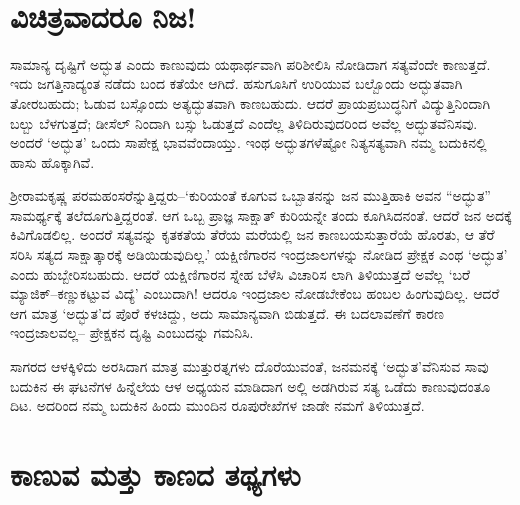  \item {}\\
\begin{flushright}
\end{flushright}



\section{ವಿಚಿತ್ರವಾದರೂ ನಿಜ!}

ಸಾಮಾನ್ಯ ದೃಷ್ಟಿಗೆ ಅದ್ಭುತ ಎಂದು ಕಾಣುವುದು ಯಥಾರ್ಥವಾಗಿ ಪರಿಶೀಲಿಸಿ ನೋಡಿದಾಗ ಸತ್ಯವೆಂದೇ ಕಾಣುತ್ತದೆ. ಇದು ಜಗತ್ತಿನಾದ್ಯಂತ ನಡೆದು ಬಂದ ಕತೆಯೇ ಆಗಿದೆ. ಹಸುಗೂಸಿಗೆ ಉರಿಯುವ ಬಲ್ಬೊಂದು ಅದ್ಭುತವಾಗಿ ತೋರಬಹುದು; ಓಡುವ ಬಸ್ಸೊಂದು ಅತ್ಯದ್ಭುತವಾಗಿ ಕಾಣಬಹುದು. ಆದರೆ ಪ್ರಾಯಪ್ರಬುದ್ಧನಿಗೆ ವಿದ್ಯುತ್ತಿನಿಂದಾಗಿ ಬಲ್ಬು ಬೆಳಗುತ್ತದೆ; ಡೀಸೆಲ್ ನಿಂದಾಗಿ ಬಸ್ಸು ಓಡುತ್ತದೆ ಎಂದೆಲ್ಲ ತಿಳಿದಿರುವುದರಿಂದ ಅವೆಲ್ಲ ಅದ್ಭುತವೆನಿಸವು. ಅಂದರೆ ‘ಅದ್ಭುತ’ ಒಂದು ಸಾಪೇಕ್ಷ ಭಾವವೆಂದಾಯ್ತು. ಇಂಥ ಅದ್ಭುತಗಳೆಷ್ಟೋ ನಿತ್ಯಸತ್ಯವಾಗಿ ನಮ್ಮ ಬದುಕಿನಲ್ಲಿ ಹಾಸು ಹೊಕ್ಕಾಗಿವೆ.

ಶ‍್ರೀರಾಮಕೃಷ್ಣ ಪರಮಹಂಸರೆನ್ನುತ್ತಿದ್ದರು–‘ಕುರಿಯಂತೆ ಕೂಗುವ ಒಬ್ಬಾತನನ್ನು ಜನ ಮುತ್ತಿಹಾಕಿ ಅವನ “ಅದ್ಭುತ” ಸಾಮರ್ಥ್ಯಕ್ಕೆ ತಲೆದೂಗುತ್ತಿದ್ದರಂತೆ. ಆಗ ಒಬ್ಬ ಪ್ರಾಜ್ಞ ಸಾಕ್ಷಾತ್ ಕುರಿಯನ್ನೇ ತಂದು ಕೂಗಿಸಿದನಂತೆ. ಆದರೆ ಜನ ಅದಕ್ಕೆ ಕಿವಿಗೊಡಲಿಲ್ಲ. ಅಂದರೆ ಸತ್ಯವನ್ನು ಕೃತಕತೆಯ ತೆರೆಯ ಮರೆಯಲ್ಲಿ ಜನ ಕಾಣಬಯಸುತ್ತಾರೆಯೆ ಹೊರತು, ಆ ತೆರೆ ಸರಿಸಿ ಸತ್ಯದ ಸಾಕ್ಷಾತ್ಕಾರಕ್ಕೆ ಅಡಿಯಿಡುವುದಿಲ್ಲ.’ ಯಕ್ಷಿಣಿಗಾರನ ಇಂದ್ರಜಾಲಗಳನ್ನು ನೋಡಿದ ಪ್ರೇಕ್ಷಕ ಎಂಥ ‘ಅದ್ಭುತ’ ಎಂದು ಹುಬ್ಬೇರಿಸಬಹುದು. ಆದರೆ ಯಕ್ಷಿಣಿಗಾರನ ಸ್ನೇಹ ಬೆಳೆಸಿ ವಿಚಾರಿಸ ಲಾಗಿ ತಿಳಿಯುತ್ತದೆ ಅವೆಲ್ಲ ‘ಬರೆ ಮ್ಯಾಜಿಕ್​–ಕಣ್ಣುಕಟ್ಟುವ ವಿದ್ಯೆ’ ಎಂಬುದಾಗಿ! ಆದರೂ ಇಂದ್ರಜಾಲ ನೋಡಬೇಕೆಂಬ ಹಂಬಲ ಹಿಂಗುವುದಿಲ್ಲ. ಆದರೆ ಆಗ ಮಾತ್ರ ‘ಅದ್ಭುತ’ದ ಪೊರೆ ಕಳಚಿದ್ದು, ಅದು ಸಾಮಾನ್ಯವಾಗಿ ಬಿಡುತ್ತದೆ. ಈ ಬದಲಾವಣೆಗೆ ಕಾರಣ ಇಂದ್ರಜಾಲವಲ್ಲ– ಪ್ರೇಕ್ಷಕನ ದೃಷ್ಟಿ ಎಂಬುದನ್ನು ಗಮನಿಸಿ.

ಸಾಗರದ ಆಳಕ್ಕಿಳಿದು ಅರಸಿದಾಗ ಮಾತ್ರ ಮುತ್ತುರತ್ನಗಳು ದೊರೆಯುವಂತೆ, ಜನಮನಕ್ಕೆ ‘ಅದ್ಭುತ’ವೆನಿಸುವ ಸಾವು ಬದುಕಿನ ಈ ಘಟನೆಗಳ ಹಿನ್ನೆಲೆಯ ಆಳ ಅಧ್ಯಯನ ಮಾಡಿದಾಗ ಅಲ್ಲಿ ಅಡಗಿರುವ ಸತ್ಯ ಒಡೆದು ಕಾಣುವುದಂತೂ ದಿಟ. ಅದರಿಂದ ನಮ್ಮ ಬದುಕಿನ ಹಿಂದು ಮುಂದಿನ ರೂಪುರೇಖೆಗಳ ಜಾಡೇ ನಮಗೆ ತಿಳಿಯುತ್ತದೆ.


\section{ಕಾಣುವ ಮತ್ತು ಕಾಣದ ತಥ್ಯಗಳು}

